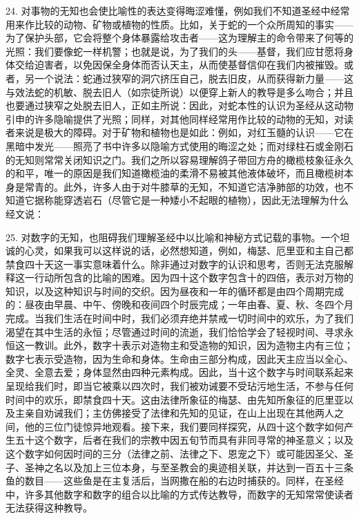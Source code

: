 24. 对事物的无知也会使比喻性的表达变得晦涩难懂，例如我们不知道圣经中经常用来作比较的动物、矿物或植物的性质。比如，关于蛇的一个众所周知的事实——为了保护头部，它会将整个身体暴露给攻击者——这为理解主的命令带来了何等的光照：我们要像蛇一样机警；也就是说，为了我们的头——基督，我们应甘愿将身体交给迫害者，以免因保全身体而否认天主，从而使基督信仰在我们内被摧毁。或者，另一个说法：蛇通过狭窄的洞穴挤压自己，脱去旧皮，从而获得新力量——这与效法蛇的机敏、脱去旧人（如宗徒所说）以便穿上新人的教导是多么吻合；并且也要通过狭窄之处脱去旧人，正如主所说：因此，对蛇本性的认识为圣经从这动物引申的许多隐喻提供了光照；同样，对其他同样经常用作比较的动物的无知，对读者来说是极大的障碍。对于矿物和植物也是如此：例如，对红玉髓的认识——它在黑暗中发光——照亮了书中许多以隐喻方式使用的晦涩之处；而对绿柱石或金刚石的无知则常常关闭知识之门。我们之所以容易理解鸽子带回方舟的橄榄枝象征永久的和平，唯一的原因是我们知道橄榄油的柔滑不易被其他液体破坏，而且橄榄树本身是常青的。此外，许多人由于对牛膝草的无知，不知道它洁净肺部的功效，也不知道它据称能穿透岩石（尽管它是一种矮小不起眼的植物），因此无法理解为什么经文说：\par

25. 对数字的无知，也阻碍我们理解圣经中以比喻和神秘方式记载的事物。一个坦诚的心灵，如果我可以这样说的话，必然想知道，例如，梅瑟、厄里亚和主自己都禁食四十天这一事实意味着什么。除非通过对数字的认识和思考，否则无法克服解释这一行动所包含的比喻的困难。因为四十这个数字包含十的四倍，表示对万物的知识，以及这种知识与时间的交织。因为昼夜和一年的循环都是由四个周期完成的：昼夜由早晨、中午、傍晚和夜间四个时辰完成；一年由春、夏、秋、冬四个月完成。当我们生活在时间中时，我们必须弃绝并禁戒一切时间中的欢乐，为了我们渴望在其中生活的永恒；尽管通过时间的流逝，我们恰恰学会了轻视时间、寻求永恒这一教训。此外，数字十表示对造物主和受造物的知识，因为造物主内有三位；数字七表示受造物，因为生命和身体。生命由三部分构成，因此天主应当以全心、全灵、全意去爱；身体显然由四种元素构成。因此，当十这个数字与时间联系起来呈现给我们时，即当它被乘以四次时，我们被劝诫要不受玷污地生活，不参与任何时间中的欢乐，即禁食四十天。这由法律所象征的梅瑟、由先知所象征的厄里亚以及主亲自劝诫我们；主仿佛接受了法律和先知的见证，在山上出现在其他两人之间，他的三位门徒惊异地观看。接下来，我们要同样探究，从四十这个数字如何产生五十这个数字，后者在我们的宗教中因五旬节而具有非同寻常的神圣意义；以及这个数字如何因时间的三分（法律之前、法律之下、恩宠之下）或可能因圣父、圣子、圣神之名以及加上三位本身，与至圣教会的奥迹相关联，并达到一百五十三条鱼的数目——这些鱼是在主复活后，当网撒在船的右边时捕获的。同样，在圣经中，许多其他数字和数字的组合以比喻的方式传达教导，而数字的无知常常使读者无法获得这种教导。\par

